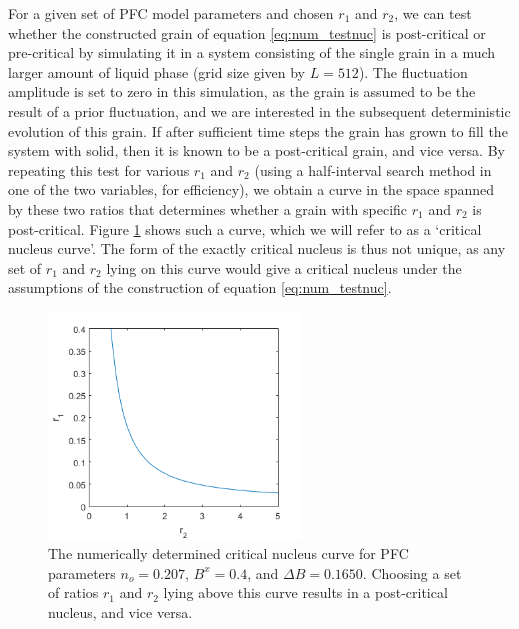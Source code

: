 For a given set of PFC model parameters and chosen $r_1$ and $r_2$, we can test whether the constructed grain of equation \ref{eq:num_testnuc} is post-critical or pre-critical by simulating it in a system consisting of the single grain in a much larger amount of liquid phase (grid size given by $L=512$). The fluctuation amplitude is set to zero in this simulation, as the grain is assumed to be the result of a prior fluctuation, and we are interested in the subsequent deterministic evolution of this grain. If after sufficient time steps the grain has grown to fill the system with solid, then it is known to be a post-critical grain, and vice versa. By repeating this test for various $r_1$ and $r_2$ (using a half-interval search method in one of the two variables, for efficiency), we obtain a curve in the space spanned by these two ratios that determines whether a grain with specific $r_1$ and $r_2$ is post-critical. Figure \ref{fig:num_ratioCurve} shows such a curve, which we will refer to as a `critical nucleus curve'. The form of the exactly critical nucleus is thus not unique, as any set of $r_1$ and $r_2$ lying on this curve would give a critical nucleus under the assumptions of the construction of equation \ref{eq:num_testnuc}.

\begin{figure}[!h]
\centering
\includegraphics[width=0.6\textwidth]{fig_num/numRatioCurve.png}
\caption{The numerically determined critical nucleus curve for PFC parameters $n_o=0.207$, $B^x=0.4$, and $\Delta B=0.1650$. Choosing a set of ratios $r_1$ and $r_2$ lying above this curve results in a post-critical nucleus, and vice versa.}\label{fig:num_ratioCurve}
\end{figure}
















